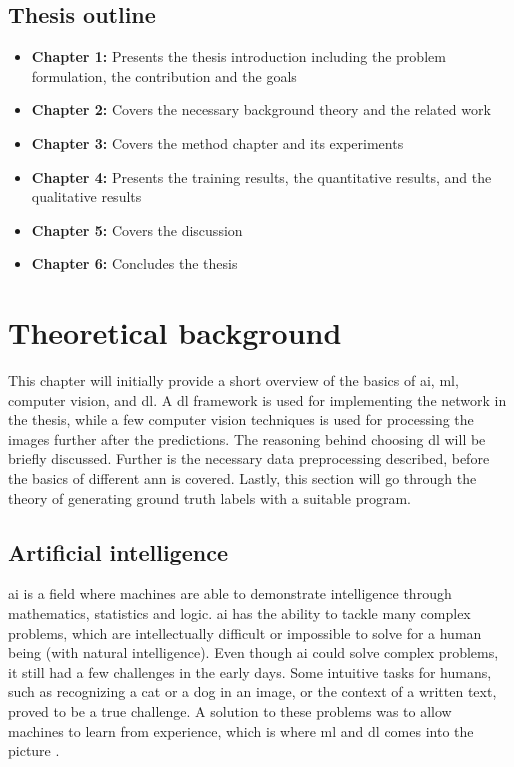 \documentclass[USenglish]{ifimaster}  %
\begin{document}
\section{Thesis outline}
\begin{itemize}
    \item \textbf{Chapter 1:}
    \newline
    Presents the thesis introduction including the problem formulation, the contribution and the goals
    \item \textbf{Chapter 2:}
    \newline
    Covers the necessary background theory and the related work
    \item \textbf{Chapter 3:}
    \newline
    Covers the method chapter and its experiments
    \item \textbf{Chapter 4:}
    \newline
    Presents the training results, the quantitative results, and the qualitative results
    \item \textbf{Chapter 5:}
    \newline
    Covers the discussion
    \item \textbf{Chapter 6:}
    \newline
    Concludes the thesis
\end{itemize}


\chapter{Theoretical background}
This chapter will initially provide a short overview of the basics of \ac{ai}, \ac{ml}, computer vision, and \acf{dl}. A \ac{dl} framework is used for implementing the network in the thesis, while a few computer vision techniques is used for processing the images further after the predictions. The reasoning behind choosing \ac{dl} will be briefly discussed. Further is the necessary data preprocessing described, before the basics of different \ac{ann} is covered. Lastly, this section will go through the theory of generating ground truth labels with a suitable program.

\section{Artificial intelligence}
\ac{ai} is a field where machines are able to demonstrate intelligence through mathematics, statistics and logic. \ac{ai} has the ability to tackle many complex problems, which are intellectually difficult or impossible to solve for a human being (with natural intelligence). Even though \ac{ai} could solve complex problems, it still had a few challenges in the early days. Some intuitive tasks for humans, such as recognizing a cat or a dog in an image, or the context of a written text, proved to be a true challenge. A solution to these problems was to allow machines to learn from experience, which is where \ac{ml} and \ac{dl} comes into the picture \cite{The_holy_grail_of_DL}.
\end{document}
